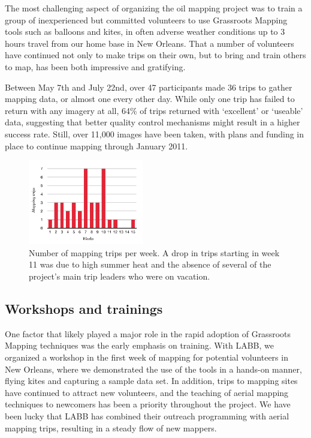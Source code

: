 \documentclass[11pt,oneside,notitlepage]{report}
\begin{document}
{{The most challenging aspect of organizing the oil mapping project was to train a group of inexperienced but committed volunteers to use Grassroots Mapping tools such as balloons and kites, in often adverse weather conditions up to 3 hours travel from our home base in New Orleans. That a number of volunteers have continued not only to make trips on their own, but to bring and train others to map, has been both impressive and gratifying.

Between May 7th and July 22nd, over 47 participants made 36 trips to gather mapping data, or almost one every other day. While only one trip has failed to return with any imagery at all, 64\% of trips returned with `excellent' or `useable' data, suggesting that better quality control mechanisms might result in a higher success rate. Still, over 11,000 images have been taken, with plans and funding in place to continue mapping through January 2011. 

\begin{figure}
	\begin{flushright}
		\includegraphics[width=0.45\textwidth]{diagrams/mapping-trips.pdf}
		\caption{Number of mapping trips per week. A drop in trips starting in week 11 was due to high summer heat and the absence of several of the project's main trip leaders who were on vacation.}
	\end{flushright}
\end{figure}

\subsection{Workshops and trainings}

One factor that likely played a major role in the rapid adoption of Grassroots Mapping techniques was the early emphasis on training. With \ac{LABB}, we organized a workshop in the first week of mapping for potential volunteers in New Orleans, where we demonstrated the use of the tools in a hands-on manner, flying kites and capturing a sample data set. In addition, trips to mapping sites have continued to attract new volunteers, and the teaching of aerial mapping techniques to newcomers has been a priority throughout the project. We have been lucky that \ac{LABB} has combined their outreach programming with aerial mapping trips, resulting in a steady flow of new mappers. 

}}
\end{document}
